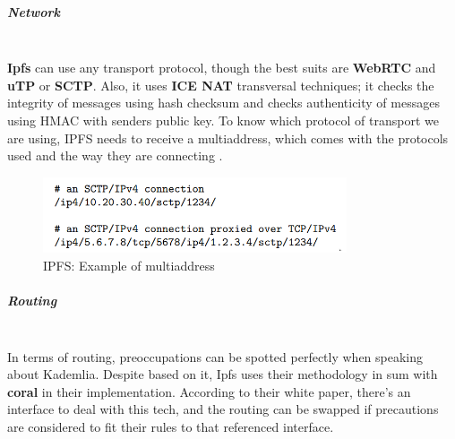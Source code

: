 \subparagraph{Network}  \mbox{} \\
\textbf{Ipfs} can use any transport protocol, though the best suits are \textbf{WebRTC} and \textbf{uTP} or \textbf{SCTP}. Also, it uses \textbf{ICE NAT} transversal techniques; it checks the integrity of
messages using hash checksum and checks authenticity of messages using HMAC with senders public key. To know which protocol of transport we are using, IPFS needs to receive a multiaddress, which comes with the protocols used and
the way they are connecting \cite{webrtc} \cite{utp} \cite{sctp} \cite{ietf-ice}.

\begin{figure}[H]
    \centering
    \includegraphics[width=0.8\textwidth]{assets/use-case-1/exampleNet+.png} %
    \caption{IPFS: Example of multiaddress}
    \label{fig:sample-image} 
\end{figure}

\subparagraph{Routing}  \mbox{} \\
In terms of routing, preoccupations can be spotted perfectly when speaking about Kademlia. Despite based on it, Ipfs uses their methodology in sum with \textbf{coral} in their implementation. According to their white paper, there's an interface to deal with this tech, and the routing can be swapped if precautions are considered to fit their rules to that referenced interface.

